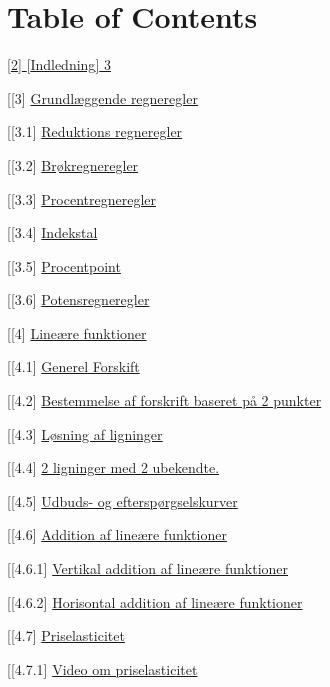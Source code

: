 \documentclass[]{book}
\begin{document}
\hypertarget{table-of-contents}{%
\chapter{Table of Contents}\label{table-of-contents}}

\protect\hyperlink{indledning}{{[}2{]} {[}Indledning{]} 3}

{[}{[}3{]}
\protect\hyperlink{grundluxe6ggende-regneregler}{Grundlæggende
regneregler}

{[}{[}3.1{]} \protect\hyperlink{reduktions-regneregler}{Reduktions
regneregler}

{[}{[}3.2{]} \protect\hyperlink{bruxf8kregneregler}{Brøkregneregler}

{[}{[}3.3{]} \protect\hyperlink{procentregneregler}{Procentregneregler}

{[}{[}3.4{]} \protect\hyperlink{indekstal}{Indekstal}

{[}{[}3.5{]} \protect\hyperlink{procentpoint}{Procentpoint}

{[}{[}3.6{]} \protect\hyperlink{potensregneregler}{Potensregneregler}

{[}{[}4{]} \protect\hyperlink{lineuxe6re-funktioner}{Lineære funktioner}

{[}{[}4.1{]} \protect\hyperlink{generel-forskift}{Generel Forskift}

{[}{[}4.2{]}
\protect\hyperlink{bestemmelse-af-forskrift-baseret-puxe5-2-punkter}{Bestemmelse
af forskrift baseret på 2 punkter}

{[}{[}4.3{]} \protect\hyperlink{luxf8sning-af-ligninger}{Løsning af
ligninger}

{[}{[}4.4{]} \protect\hyperlink{ligninger-med-2-ubekendte.}{2 ligninger
med 2 ubekendte.}

{[}{[}4.5{]}
\protect\hyperlink{udbuds--og-efterspuxf8rgselskurver}{Udbuds- og
efterspørgselskurver}

{[}{[}4.6{]}
\protect\hyperlink{addition-af-lineuxe6re-funktioner}{Addition af
lineære funktioner}

{[}{[}4.6.1{]}
\protect\hyperlink{vertikal-addition-af-lineuxe6re-funktioner}{Vertikal
addition af lineære funktioner}

{[}{[}4.6.2{]}
\protect\hyperlink{horisontal-addition-af-lineuxe6re-funktioner}{Horisontal
addition af lineære funktioner}

{[}{[}4.7{]} \protect\hyperlink{priselasticitet}{Priselasticitet}

{[}{[}4.7.1{]} \protect\hyperlink{video-om-priselasticitet}{Video om
priselasticitet}
\end{document}
